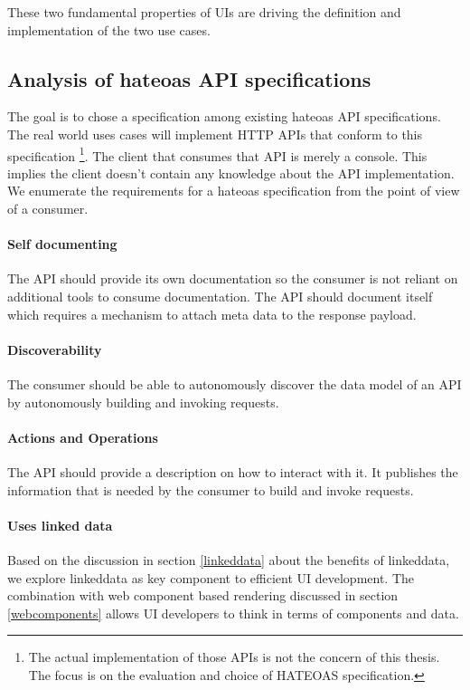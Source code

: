 These two fundamental properties of UIs are driving the definition and implementation of the two use cases.

\subsection{Analysis of \gls{hateoas} API specifications}\label{sec:analysishateoas}
The goal is to chose a specification among existing \gls{hateoas} API specifications. The real world uses cases will implement HTTP APIs that conform to this specification \footnote{The actual implementation of those APIs is not the concern of this thesis. The focus is on the evaluation and choice of HATEOAS specification.}. The client that consumes that API is merely a \gls{console}. This implies the client doesn't contain any knowledge about the API implementation. \\
We enumerate the requirements for a \gls{hateoas} specification from the point of view of a consumer.

\paragraph{Self documenting}
The API should provide its own documentation so the consumer is not reliant on additional tools to consume documentation. The API should document itself which requires a mechanism to attach meta data to the response payload.

\paragraph{Discoverability}
The consumer should be able to autonomously discover the data model of an API by autonomously building and invoking requests.

\paragraph{Actions and Operations}
The API should provide a description on how to interact with it. It publishes the information that is needed by the consumer to build and invoke requests.

\paragraph{Uses linked data}
Based on the discussion in section \ref{linkeddata} about the benefits of \gls{linkeddata}, we explore \gls{linkeddata} as key component to efficient UI development. The combination with web component based rendering discussed in section \ref{webcomponents} allows UI developers to think in terms of components and data.

